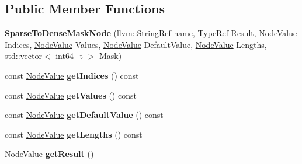 \subsection*{Public Member Functions}
\begin{DoxyCompactItemize}
\item 
\mbox{\label{classglow_1_1_sparse_to_dense_mask_node_a7004ffcb88213ccb34e74c12ff141999}} 
{\bfseries Sparse\+To\+Dense\+Mask\+Node} (llvm\+::\+String\+Ref name, \hyperlink{structglow_1_1_type}{Type\+Ref} Result, \hyperlink{structglow_1_1_node_value}{Node\+Value} Indices, \hyperlink{structglow_1_1_node_value}{Node\+Value} Values, \hyperlink{structglow_1_1_node_value}{Node\+Value} Default\+Value, \hyperlink{structglow_1_1_node_value}{Node\+Value} Lengths, std\+::vector$<$ int64\+\_\+t $>$ Mask)
\item 
\mbox{\label{classglow_1_1_sparse_to_dense_mask_node_a5d3f62d57a39e8075ce1bf0c4ef6ef49}} 
const \hyperlink{structglow_1_1_node_value}{Node\+Value} {\bfseries get\+Indices} () const
\item 
\mbox{\label{classglow_1_1_sparse_to_dense_mask_node_ad23e13c03dd63b8ace12d21aa3c63409}} 
const \hyperlink{structglow_1_1_node_value}{Node\+Value} {\bfseries get\+Values} () const
\item 
\mbox{\label{classglow_1_1_sparse_to_dense_mask_node_ac734799a883263d16f70150f11de5959}} 
const \hyperlink{structglow_1_1_node_value}{Node\+Value} {\bfseries get\+Default\+Value} () const
\item 
\mbox{\label{classglow_1_1_sparse_to_dense_mask_node_a304e83a34bfebf39132d306a590d50ee}} 
const \hyperlink{structglow_1_1_node_value}{Node\+Value} {\bfseries get\+Lengths} () const
\item 
\mbox{\label{classglow_1_1_sparse_to_dense_mask_node_a45e0d640c208c14115293d41442cd4e3}} 
\hyperlink{structglow_1_1_node_value}{Node\+Value} {\bfseries get\+Result} ()
\item 
\mbox{\label{classglow_1_1_sparse_to_dense_mask_node_ab002477632097a209fe1a7b5069f2bb5}} 

\end{DoxyCompactItemize}
